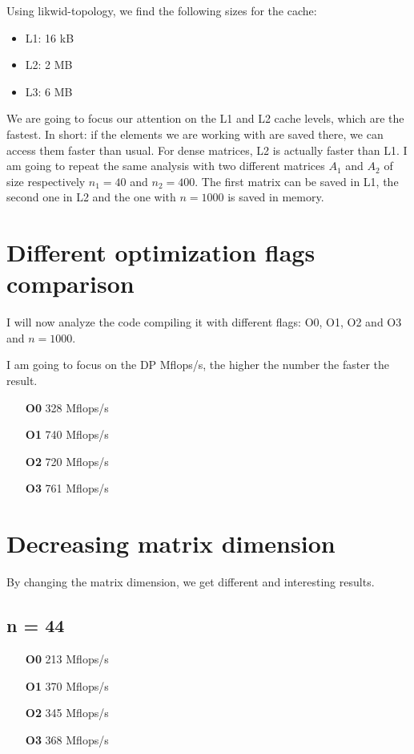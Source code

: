 \documentclass[11pt,a4paper,oneside,titlepage,openright]{book}
\begin{document}
Using likwid-topology, we find the following sizes for the cache: 
\begin{itemize}
\item L1: 16 kB
\item L2: 2 MB
\item L3: 6 MB
\end{itemize}
We are going to focus our attention on the L1 and L2 cache levels, which are the fastest. In short: if the elements we are working with are saved there, we can access them faster than usual.  For dense matrices, L2 is actually faster than L1. I am going to repeat the same analysis with two different matrices $A_1$ and $A_2$ of size respectively $n_1 = 40$ and  $n_2 = 400$.  The first matrix can be saved in L1, the second one in L2 and the one with $n=1000$ is saved in memory.  

 
\section{Different optimization flags comparison}
I will now analyze the code compiling it with different flags: O0, O1, O2 and O3 and $n = 1000$.

I am going to focus on the DP Mflops/s, the higher the number the faster the result. 
\begin{itemize}
\item[\textbf{O0}] 328  Mflops/s
\item[\textbf{O1}] 740 Mflops/s
\item[\textbf{O2}] 720 Mflops/s
\item[\textbf{O3}] 761 Mflops/s
\end{itemize}


\section{Decreasing matrix dimension} 
By changing the matrix dimension, we get different and interesting results. 

\subsection{ n = 44}

\begin{itemize}
\item[\textbf{O0}] 213  Mflops/s
\item[\textbf{O1}] 370 Mflops/s
\item[\textbf{O2}] 345 Mflops/s
\item[\textbf{O3}] 368 Mflops/s
\end{itemize}
\end{document}
